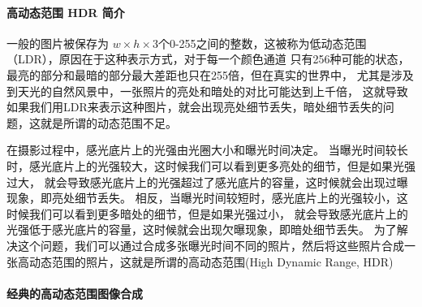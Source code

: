 \paragraph{高动态范围 HDR 简介}

一般的图片被保存为 $w\times h\times 3$个0-255之间的整数，这被称为低动态范围（LDR），原因在于这种表示方式，对于每一个颜色通道
只有256种可能的状态，最亮的部分和最暗的部分最大差距也只在255倍，但在真实的世界中，
尤其是涉及到天光的自然风景中，一张照片的亮处和暗处的对比可能达到上千倍，
这就导致如果我们用LDR来表示这种图片，就会出现亮处细节丢失，暗处细节丢失的问题，这就是所谓的动态范围不足。

在摄影过程中，感光底片上的光强由光圈大小和曝光时间决定。
当曝光时间较长时，感光底片上的光强较大，这时候我们可以看到更多亮处的细节，但是如果光强过大，
就会导致感光底片上的光强超过了感光底片的容量，这时候就会出现过曝现象，即亮处细节丢失。
相反，当曝光时间较短时，感光底片上的光强较小，这时候我们可以看到更多暗处的细节，但是如果光强过小，
就会导致感光底片上的光强低于感光底片的容量，这时候就会出现欠曝现象，即暗处细节丢失。
为了解决这个问题，我们可以通过合成多张曝光时间不同的照片，然后将这些照片合成一张高动态范围的照片，这就是所谓的高动态范围(High Dynamic Range, HDR) 

\paragraph{经典的高动态范围图像合成}